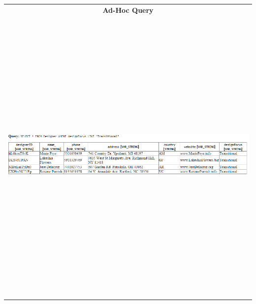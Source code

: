 \documentclass[american,extrafontsizes,12pt,portrait,letterpaper,oneside,onecolumn,final]{memoir}
\begin{document}
\begin{longtabu}{|c|}
\hline
\textbf{Ad\hyp Hoc Query}\\*
\includegraphics[keepaspectratio=true,width=40em,height=40em]{snapshots/sampleAdHoc.PNG}\\
\lasthline
\end{longtabu}

\backmatter
\end{document}
